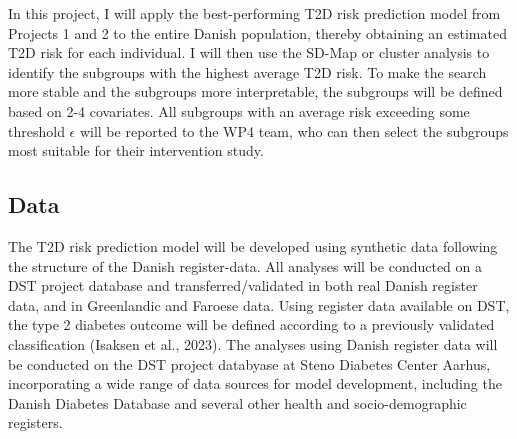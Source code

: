 \documentclass{article}
\makeatletter
\newcommand{\citeprocitem}[2]{\hyper@linkstart{cite}{citeproc_bib_item_#1}#2\hyper@linkend}
\makeatother
\begin{document}
In this project, I will apply the best-performing T2D risk prediction model from Projects 1 and 2 to the entire Danish population, thereby obtaining an estimated T2D risk for each individual. I will then use the SD-Map or cluster analysis to identify the subgroups with the highest average T2D risk. To make the search more stable and the subgroups more interpretable, the subgroups will be defined based on 2-4 covariates. All subgroups with an average risk exceeding some threshold \(\epsilon\) will be reported to the WP4 team, who can then select the subgroups most suitable for their intervention study.


\subsection*{Data}
\label{sec:org6f38c34}
The T2D risk prediction model will be developed using synthetic data following the
structure of the Danish register-data. All analyses will be conducted
on a DST project database and transferred/validated in both real
Danish register data, and in Greenlandic and Faroese data. Using
register data available on DST, the type 2 diabetes outcome will be
defined according to a previously validated classification
(\citeprocitem{2}{Isaksen et al., 2023}). The analyses using Danish register data
will be conducted on the DST project databyase at Steno Diabetes
Center Aarhus, incorporating a wide range of data sources for model
development, including the Danish Diabetes Database and several other
health and socio-demographic registers.

\newpage
\end{document}
